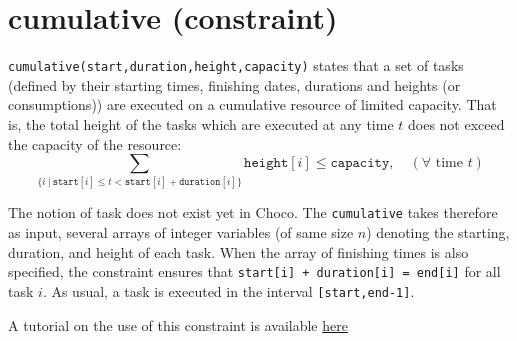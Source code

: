 \label{cumulative}
\hypertarget{cumulative}{}

\section{cumulative (constraint)}\label{cumulative:cumulativeconstraint}\hypertarget{cumulative:cumulativeconstraint}{}
\begin{notedef}
  \texttt{cumulative(start,duration,height,capacity)} states that a set of tasks (defined by their starting times, finishing dates, durations and heights (or consumptions)) are executed on a cumulative resource of limited capacity. That is, the total height of the tasks which are executed at any time $t$ does not exceed the capacity of the resource:
$$\sum_{\{i\ |\ \mathtt{start}[i]\le t < \mathtt{start}[i]+\mathtt{duration}[i]\}} \mathtt{height}[i] \le \mathtt{capacity},\quad (\forall \text{ time } t)$$
\end{notedef}

The notion of task does not exist yet in Choco. The \texttt{cumulative} takes therefore as input, several arrays of integer variables (of same size $n$) denoting the starting, duration, and height of each task. When the array of finishing times is also specified, the constraint ensures that \texttt{start[i] + duration[i] = end[i]} for all task $i$.
As usual, a task is executed in the interval \texttt{[start,end-1]}.

A tutorial on the use of this constraint is available \hyperlink{schedulinganduseofthecumulative:schedulinganduseofthecumulativeconstraint}{here}

